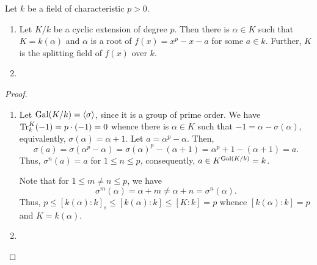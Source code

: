 \begin{theorem}
    Let $k$ be a field of characteristic $p > 0$.
    \begin{enumerate}[label=(\alph*)]
        \item Let $K/k$ be a cyclic extension of degree $p$. Then there is $\alpha\in K$ such that $K = k(\alpha)$ and $\alpha$ is a root of $f(x) = x^p - x - a$ for some $a\in k$. Further, $K$ is the splitting field of $f(x)$ over $k$.

        \item 
    \end{enumerate}
\end{theorem}
\begin{proof}
\begin{enumerate}[label=(\alph*)]
    \item Let $\operatorname{Gal}(K/k) = \langle\sigma\rangle$, since it is a group of prime order. We have $\operatorname{Tr}^K_k(-1) = p\cdot(-1) = 0$ whence there is $\alpha\in K$ such that $-1 = \alpha - \sigma(\alpha)$, equivalently, $\sigma(\alpha) = \alpha + 1$. Let $a = \alpha^p - \alpha$. Then,
    \begin{equation*}
        \sigma(a) = \sigma(\alpha^p - \alpha) = \sigma(\alpha)^p - (\alpha + 1) = \alpha^p + 1 - (\alpha + 1) = a.
    \end{equation*}
    Thus, $\sigma^n(a) = a$ for $1\le n\le p$, consequently, $a\in K^{\operatorname{Gal}(K/k)} = k$. 

    Note that for $1\le m\ne n\le p$, we have 
    \begin{equation*}
        \sigma^m(\alpha) = \alpha + m\ne\alpha + n = \sigma^n(\alpha).
    \end{equation*}
    Thus, $p\le [k(\alpha):k]_s\le[k(\alpha):k]\le[K:k] = p$ whence $[k(\alpha):k] = p$ and $K = k(\alpha)$.

    \item \qedhere
\end{enumerate}
\end{proof}